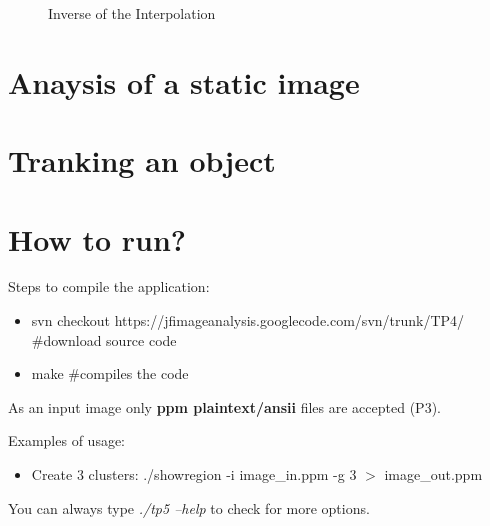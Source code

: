 \documentclass{article}
\begin{document}
	\begin{figure}[H]
		  \centering
		  \hspace{0.1cm}
		  \hspace{0.1cm}
		  \caption{Inverse of the Interpolation}
		  \label{fig:inverseinterp}
	\end{figure}	


\section{Anaysis of a static image}


\section{Tranking an object}


\section{How to run?}

	Steps to compile the application:
	
	\begin{itemize}
		\item svn checkout https://jfimageanalysis.googlecode.com/svn/trunk/TP4/ \#download source code
		\item make \#compiles the code
	\end{itemize}

	As an input image only {\bf ppm plaintext/ansii} files are accepted (P3). 

	Examples of usage:

	\begin{itemize}
		\item Create 3 clusters:
		\subitem ./showregion -i image\_in.ppm -g 3 $>$ image\_out.ppm
	\end{itemize}

	You can always type {\it ./tp5 --help} to check for more options. 
\end{document}
